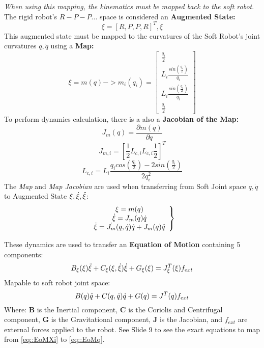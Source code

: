 \documentclass[onecolumn,a4paper]{article}
\begin{document}
\emph{When using this mapping, the kinematics must be mapped back to the soft robot}. The rigid robot's $R-P-P...$ space is considered an \textbf{Augmented State:}
\begin{equation}
    \xi = [R, P, P, R]^T, \Dot{\xi}
\end{equation}
This augmented state must be mapped to the curvatures of the Soft Robot's joint curvatures $q, \Dot{q}$ using a \textbf{Map:}
\begin{equation}
    \xi = m(q) -> m_i(q_i) = \left[\begin{array}{c}
         \frac{q_i}{2} \\
         L_i \frac{sin(\frac{q_i}{2})}{q_i} \\
         L_i \frac{sin(\frac{q_i}{2})}{q_i} \\
         \frac{q_i}{2}          
    \end{array}\right]
\end{equation}
To perform dynamics calculation, there is a also a \textbf{Jacobian of the Map:}
\begin{equation}
    J_m(q)=\frac{\partial m(q)}{\partial q}
\end{equation}
\begin{equation}
    J_{m, i} = [\frac{1}{2} L_{c,i} L_{c, i} \frac{1}{2}]^T
\end{equation}
\begin{equation} 
    L_{c, i} = L_i \frac{q_i cos(\frac{q_i}{2}) - 2sin(\frac{q_i}{2})}{2q_i^2}
\end{equation}
The \emph{Map} and \emph{Map Jacobian} are used when transferring from Soft Joint space $q, \Dot{q}$ to Augmented State $\xi, \Dot{\xi}, \Ddot{\xi}$:
\begin{equation}
    \left. \begin{array}{c}
        \xi = m(q) \\
        \Dot{\xi} = J_m(q)\Dot{q} \\
        \Ddot{\xi} = \Dot{J_m}(q, \Dot{q})\Dot{q} + J_m(q)\Ddot{q}
    \end{array}\right\}
\end{equation}

These dynamics are used to transfer an \textbf{Equation of Motion} containing 5 components:
\begin{equation}
    B_\xi(\xi)\Ddot{\xi} + C_\xi(\xi,\Dot{\xi})\Dot{\xi} + G_\xi(\xi) = J_\xi^T(\xi)f_{ext}
    \label{eq::EoMXi}
\end{equation}
Mapable to soft robot joint space:
\begin{equation}
    B(q)\Ddot{q} + C(q,\Dot{q})\Dot{q} + G(q) = J^T(q)f_{ext}
    \label{eq::EoMq}
\end{equation}
Where: \textbf{B} is the Inertial component, \textbf{C} is the Coriolis and Centrifugal component, \textbf{G} is the Gravitational component, \textbf{J} is the Jacobian, and \textbf{$f_{ext}$} are external forces applied to the robot. See Slide 9 to see the exact equations to map from \eqref{eq::EoMXi} to \eqref{eq::EoMq}.
\end{document}
